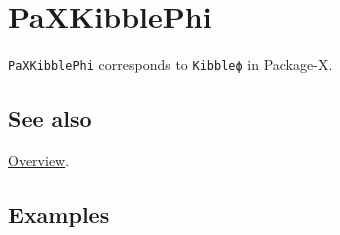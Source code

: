 \documentclass[../FeynHelpersManual.tex]{subfiles}
\begin{document}
\hypertarget{paxkibblephi}{
\section{PaXKibblePhi}\label{paxkibblephi}}

\texttt{PaXKibblePhi} corresponds to \texttt{Kibbleϕ} in Package-X.

\subsection{See also}

\hyperlink{toc}{Overview}.

\subsection{Examples}
\end{document}
